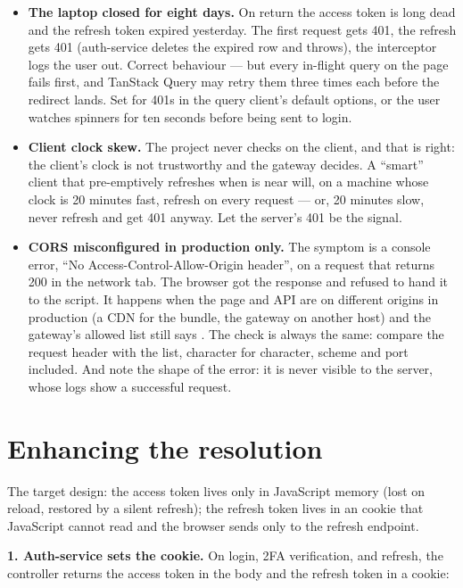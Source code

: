 \begin{itemize}
  \item \textbf{The laptop closed for eight days.} On return the
  access token is long dead and the refresh token expired yesterday.
  The first request gets 401, the refresh gets 401 (auth-service
  deletes the expired row and throws), the interceptor logs the user
  out. Correct behaviour --- but every in-flight query on the page
  fails first, and TanStack Query may retry them three times each
  before the redirect lands. Set  for 401s in the
  query client's default options, or the user watches spinners for
  ten seconds before being sent to login.
  \item \textbf{Client clock skew.} The project never checks
   on the client, and that is right: the client's clock is
  not trustworthy and the gateway decides. A ``smart'' client that
  pre-emptively refreshes when  is near will, on a machine
  whose clock is 20 minutes fast, refresh on every request --- or, 20
  minutes slow, never refresh and get 401 anyway. Let the server's 401
  be the signal.
  \item \textbf{CORS misconfigured in production only.} The symptom is
  a console error, ``No Access-Control-Allow-Origin header'', on a
  request that returns 200 in the network tab. The browser got the
  response and refused to hand it to the script. It happens when the
  page and API are on different origins in production (a CDN for the
  bundle, the gateway on another host) and the gateway's allowed list
  still says . The check is always the same: compare
  the  request header with the 
  list, character for character, scheme and port included. And note
  the shape of the error: it is never visible to the server, whose
  logs show a successful request.
\end{itemize}

\section{Enhancing the resolution}
\label{sec:fe-enhance}

The target design: the access token lives only in JavaScript memory
(lost on reload, restored by a silent refresh); the refresh token lives
in an  cookie that JavaScript cannot read and the
browser sends only to the refresh endpoint.

\textbf{1. Auth-service sets the cookie.} On login, 2FA verification,
and refresh, the controller returns the access token in the body and
the refresh token in a cookie:

